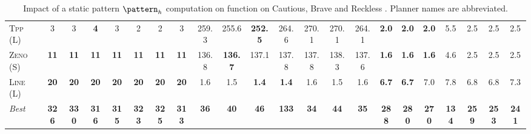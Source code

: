 \documentclass[11pt,landscape]{article}
\begin{document}
\begin{table}[tb]
{\begin{tabular}{|l||ccccccc||ccccccc||ccccccc||}
\textsc{Tpp} (L)&3&3&\textbf{4}&3&2&2&3&259.3&255.6&\textbf{252.5}&264.6&270.1&270.1&264.1&\textbf{2.0}&\textbf{2.0}&\textbf{2.0}&5.5&2.5&2.5&2.5\\
\textsc{Zeno} (S)&\textbf{11}&\textbf{11}&\textbf{11}&\textbf{11}&\textbf{11}&\textbf{11}&\textbf{11}&136.8&\textbf{136.7}&137.1&137.8&137.8&138.3&137.6&\textbf{1.6}&\textbf{1.6}&\textbf{1.6}&4.6&2.5&2.5&2.5\\
\textsc{Line} (L)&\textbf{20}&\textbf{20}&\textbf{20}&\textbf{20}&\textbf{20}&\textbf{20}&\textbf{20}&1.6&1.5&\textbf{1.4}&\textbf{1.4}&1.6&1.5&1.6&\textbf{6.7}&\textbf{6.7}&7.0&7.8&6.8&6.8&7.3
\\\hline
\textit{Best}&\textbf{326}&\textbf{330}&\textbf{316}&\textbf{315}&\textbf{323}&\textbf{325}&\textbf{313}&\textbf{36}&\textbf{40}&\textbf{46}&\textbf{133}&\textbf{34}&\textbf{44}&\textbf{35}&\textbf{288}&\textbf{280}&\textbf{270}&\textbf{134}&\textbf{259}&\textbf{253}&\textbf{241}\\\hline

        \end{tabular}}
        \caption{Impact of a static pattern $\pattern_h$ computation on function on Cautious, Brave and Reckless \pattyd. Planner names are abbreviated.}
        \label{tab:abl-patternh-static}
        \end{table}
        
\end{document}

